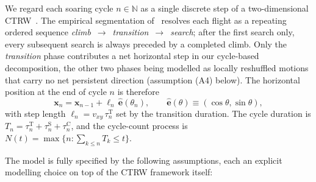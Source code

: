 \documentclass[11pt,a4paper]{article}
\begin{document}
We regard each soaring cycle $n \in \mathbb{N}$ as a single discrete
step of a two-dimensional CTRW~\cite{metzler2000,scalas2004}. The
empirical segmentation of~\cite{vilpellet2026} resolves each flight as
a repeating ordered sequence
\emph{climb}~$\to$~\emph{transition}~$\to$~\emph{search};
after the first search only, every subsequent search is always
preceded by a completed climb. Only the \emph{transition} phase
contributes a net horizontal step in our cycle-based decomposition,
the other two phases being modelled as locally reshuffled motions
that carry no net persistent direction (assumption (A4) below). The
horizontal position at the end of cycle $n$ is therefore
\begin{equation}
\mathbf{x}_n = \mathbf{x}_{n-1} + \ell_n\,\hat{\mathbf{e}}(\theta_n),
\qquad \hat{\mathbf{e}}(\theta) \equiv (\cos\theta,\sin\theta),
\label{eq:step}
\end{equation}
with step length $\ell_n = v_{xy}\,\tau_n^{\mathrm{T}}$ set by the
transition duration. The cycle duration is $T_n = \tau_n^{\mathrm{T}}
+ \tau_n^{\mathrm{S}} + \tau_n^{\mathrm{C}}$, and the cycle-count
process is $N(t) = \max\{n : \sum_{k \le n} T_k \le t\}$.

The model is fully specified by the following assumptions, each an
explicit modelling choice on top of the CTRW framework itself:
\end{document}
